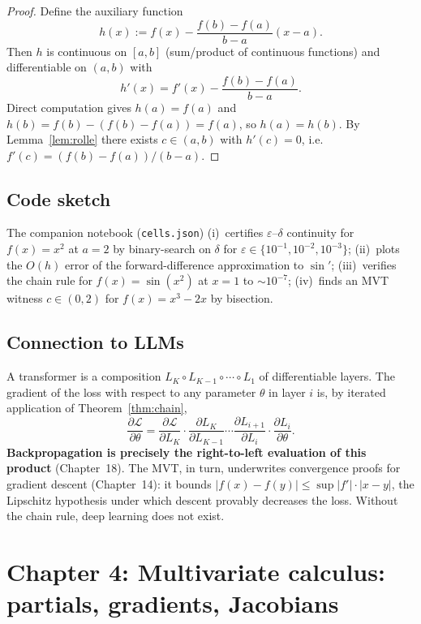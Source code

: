 \documentclass[11pt]{article}
\theoremstyle{remark}
\begin{document}
\begin{proof}
Define the auxiliary function
\[
h(x):=f(x)-\frac{f(b)-f(a)}{b-a}(x-a).
\]
Then $h$ is continuous on $[a,b]$ (sum/product of continuous functions) and differentiable on $(a,b)$ with
\[
h'(x)=f'(x)-\frac{f(b)-f(a)}{b-a}.
\]
Direct computation gives $h(a)=f(a)$ and $h(b)=f(b)-(f(b)-f(a))=f(a)$, so $h(a)=h(b)$. By Lemma~\ref{lem:rolle} there exists $c\in(a,b)$ with $h'(c)=0$, i.e.\ $f'(c)=(f(b)-f(a))/(b-a)$.
\end{proof}

\subsection*{Code sketch}

The companion notebook (\texttt{cells.json}) (i)~certifies $\varepsilon$--$\delta$ continuity for $f(x)=x^2$ at $a=2$ by binary-search on $\delta$ for $\varepsilon\in\{10^{-1},10^{-2},10^{-3}\}$; (ii)~plots the $O(h)$ error of the forward-difference approximation to $\sin'$; (iii)~verifies the chain rule for $f(x)=\sin(x^2)$ at $x=1$ to $\sim 10^{-7}$; (iv)~finds an MVT witness $c\in(0,2)$ for $f(x)=x^3-2x$ by bisection.

\subsection*{Connection to LLMs}

A transformer is a composition $L_K\circ L_{K-1}\circ\cdots\circ L_1$ of differentiable layers. The gradient of the loss with respect to any parameter $\theta$ in layer $i$ is, by iterated application of Theorem~\ref{thm:chain},
\[
\frac{\partial \mathcal{L}}{\partial \theta}=\frac{\partial \mathcal{L}}{\partial L_K}\cdot\frac{\partial L_K}{\partial L_{K-1}}\cdots\frac{\partial L_{i+1}}{\partial L_i}\cdot\frac{\partial L_i}{\partial \theta}.
\]
\textbf{Backpropagation is precisely the right-to-left evaluation of this product} (Chapter~18). The MVT, in turn, underwrites convergence proofs for gradient descent (Chapter~14): it bounds $|f(x)-f(y)|\le\sup|f'|\cdot|x-y|$, the Lipschitz hypothesis under which descent provably decreases the loss. Without the chain rule, deep learning does not exist.


\section*{Chapter 4: Multivariate calculus: partials, gradients, Jacobians}
\end{document}
